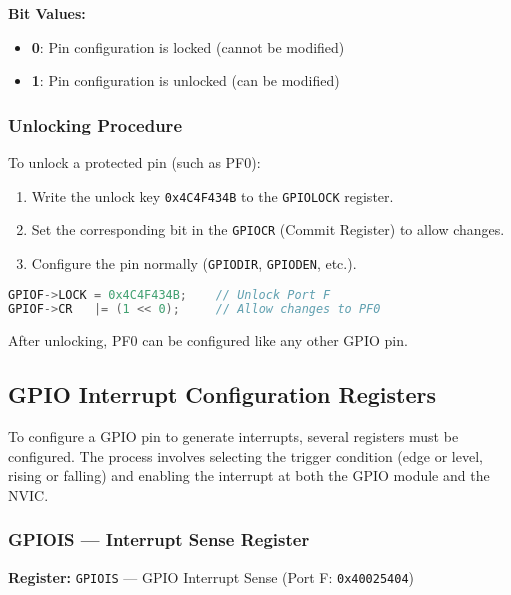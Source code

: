 \noindent
\textbf{Bit Values:}
\begin{itemize}[nosep]
  \item \textbf{0}: Pin configuration is locked (cannot be modified)
  \item \textbf{1}: Pin configuration is unlocked (can be modified)
\end{itemize}

\bigskip
\subsubsection*{Unlocking Procedure}

To unlock a protected pin (such as PF0):

\begin{enumerate}[nosep]
  \item Write the unlock key \texttt{0x4C4F434B} to the \texttt{GPIOLOCK} register.
  \item Set the corresponding bit in the \texttt{GPIOCR} (Commit Register) to allow changes.
  \item Configure the pin normally (\texttt{GPIODIR}, \texttt{GPIODEN}, etc.).
\end{enumerate}

\begin{lstlisting}[caption={Unlocking PF0 for GPIO use}, language=C]
GPIOF->LOCK = 0x4C4F434B;    // Unlock Port F
GPIOF->CR   |= (1 << 0);     // Allow changes to PF0
\end{lstlisting}

\noindent
After unlocking, PF0 can be configured like any other GPIO pin.

\bigskip
\subsection{GPIO Interrupt Configuration Registers}

To configure a GPIO pin to generate interrupts, several registers must be configured. The process involves selecting the trigger condition (edge or level, rising or falling) and enabling the interrupt at both the GPIO module and the NVIC.

\subsubsection*{GPIOIS — Interrupt Sense Register}

\noindent\textbf{Register:} \texttt{GPIOIS} — GPIO Interrupt Sense (Port F: \texttt{0x40025404})

